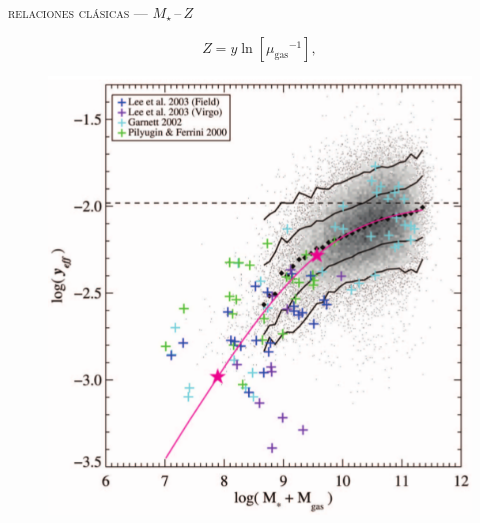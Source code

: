 \documentclass[xcolor=dvipsnames,4pt,hyperref={colorlinks,citecolor=black,linkcolor=black,urlcolor=black}]{beamer}
\begin{document}
\begin{frame}{\textsc{relaciones clásicas --- $M_\star\,$--$\,Z$}}


%
$$Z = y\ln{\left[{\mu_\text{gas}}^{-1}\right]},$$
%
\begin{figure}
\includegraphics[scale=1]{img/tremonti2004-8}
\end{figure}
\end{frame}
\end{document}
